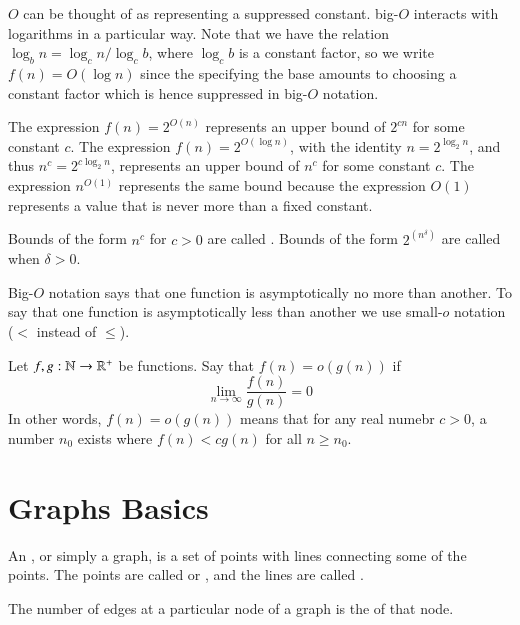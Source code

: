 \documentclass[12pt, a4paper, oneside, openright, titlepage]{book}
\begin{document}
\begin{appendices}
        $O$ can be thought of as representing a suppressed constant. big-$O$ interacts with logarithms in a particular way. Note that we have the relation $\log_bn = \log_cn/\log_cb$, where $\log_cb$ is a constant factor, so we write $f(n) = O(\log n)$ since the specifying the base amounts to choosing a constant factor which is hence suppressed in big-$O$ notation.

        The expression $f(n) = 2^{O(n)}$ represents an upper bound of $2^{cn}$ for some constant $c$. The expression $f(n) = 2^{O(\log n)}$, with the identity $n = 2^{\log_2n}$, and thus $n^c = 2^{c\log_2n}$, represents an upper bound of $n^c$ for some constant $c$. The expression $n^{O(1)}$ represents the same bound because the expression $O(1)$ represents a value that is never more than a fixed constant.

        Bounds of the form $n^c$ for $c > 0$ are called . Bounds of the form $2^{(n^{\delta})}$ are called  when $\delta > 0$.


        Big-$O$ notation says that one function is asymptotically no more than another. To say that one function is asymptotically less than another we use small-$o$ notation ($<$ instead of $\leq$).

        \begin{defn}
            Let $f,g:\mathbb N\rightarrow \mathbb R^+$ be functions. Say that $f(n) = o(g(n))$ if \begin{equation*}
                \lim\limits_{n\rightarrow \infty}\frac{f(n)}{g(n)} = 0
            \end{equation*}
            In other words, $f(n) = o(g(n))$ means that for any real numebr $c > 0$, a number $n_0$ exists where $f(n) < cg(n)$ for all $n \geq n_0$.
        \end{defn}



        \section{Graphs Basics}

        \begin{defn}
            An , or simply a graph, is a set of points with lines connecting some of the points. The points are called  or , and the lines are called .
        \end{defn}


        \begin{defn}
            The number of edges at a particular node of a graph is the  of that node.
        \end{defn}


\end{appendices}
\end{document}
